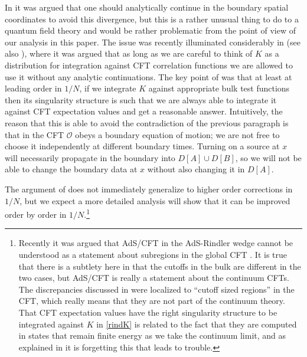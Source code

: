 \documentclass[11pt]{article}
\newcommand{\mO}{\mathcal{O}}
\begin{document}
In \cite{Hamilton:2006az} it was argued that one should analytically continue in the boundary spatial coordinates to avoid this divergence, but this is a rather unusual thing to do to a quantum field theory and would be rather problematic from the point of view of our analysis in this paper.  The issue was recently illuminated considerably in \cite{Morrison:2014jha} (see also \cite{Papadodimas:2012aq}), where it was argued that as long as we are careful to think of $K$ as a distribution for integration against CFT correlation functions we are allowed to use it without any analytic continuations.  The key point of \cite{Morrison:2014jha} was that at least at leading order in $1/N$, if we integrate $K$ against appropriate bulk test functions then its singularity structure is such that we are always able to integrate it against CFT expectation values
and get a reasonable answer.  Intuitively, the reason that this is able to avoid the contradiction of the previous paragraph is that in the CFT $\mO$ obeys a boundary equation of motion; we are not free to choose it independently at different boundary times.  Turning on a source at $x$ will necessarily propagate in the boundary into $D[A]\cup D[B]$, so we will not be able to change the boundary data at $x$ without also changing it in $D[A]$.    

The argument of \cite{Morrison:2014jha} does not immediately generalize to higher order corrections in $1/N$, but we expect a more detailed analysis will show that it can be improved order by order in $1/N$.\footnote{Recently it was argued that AdS/CFT in the AdS-Rindler wedge cannot be understood as a statement about subregions in the global CFT \cite{Chowdhury:2014oba}.  It is true that there is a subtlety here in that the cutoffs in the bulk are different in the two cases, but AdS/CFT is really a statement about the continuum CFTs.  The discrepancies discussed in \cite{Chowdhury:2014oba} were localized to ``cutoff sized regions'' in the CFT, which really means that they are not part of the continuum theory.  That CFT expectation values have the right singularity structure to be integrated against $K$ in \eqref{rindK} is related to the fact that they are computed in states that remain finite energy as we take the continuum limit, and as explained in \cite{Morrison:2014jha} it is forgetting this that leads to trouble.}
 
\end{document}
